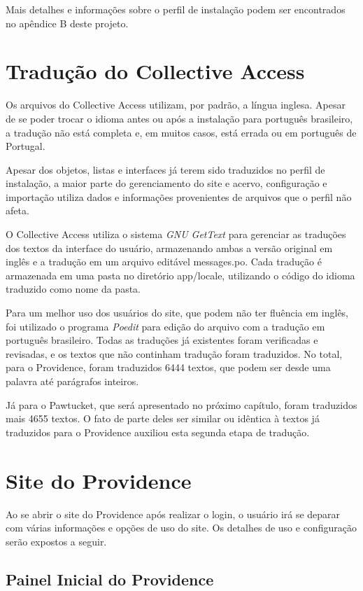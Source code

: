 \documentclass[a4paper,12pt,oneside,onecolumn,final,fleqn]{repUERJ}
\begin{document}
Mais detalhes e informações sobre o perfil de instalação podem ser encontrados no apêndice B deste projeto.

\section{Tradução do Collective Access}

Os arquivos do Collective Access utilizam, por padrão, a língua inglesa. Apesar de se poder trocar o idioma antes ou após a instalação para português brasileiro, a tradução não está completa e, em muitos casos, está errada ou em português de Portugal.

Apesar dos objetos, listas e interfaces já terem sido traduzidos no perfil de instalação, a maior parte do gerenciamento do site e acervo, configuração e importação utiliza dados e informações provenientes de arquivos que o perfil não afeta.

O Collective Access utiliza o sistema \textit{GNU GetText} para gerenciar as traduções dos textos da interface do usuário, armazenando ambas a versão original em inglês e a tradução em um arquivo editável messages.po. Cada tradução é armazenada em uma pasta no diretório app/locale, utilizando o código do idioma traduzido como nome da pasta.

Para um melhor uso dos usuários do site, que podem não ter fluência em inglês, foi utilizado o programa \textit{Poedit} para edição do arquivo com a tradução em português brasileiro. Todas as traduções já existentes foram verificadas e revisadas, e os textos que não continham tradução foram traduzidos. No total, para o Providence, foram traduzidos 6444 textos, que podem ser desde uma palavra até parágrafos inteiros. 

Já para o Pawtucket, que será apresentado no próximo capítulo, foram traduzidos mais 4655 textos. O fato de parte deles ser similar ou idêntica à textos já traduzidos para o Providence auxiliou esta segunda etapa de tradução.

\section{Site do Providence}

Ao se abrir o site do Providence após realizar o login, o usuário irá se deparar com várias informações e opções de uso do site. Os detalhes de uso e configuração serão expostos a seguir.

\subsection{Painel Inicial do Providence}
\end{document}

